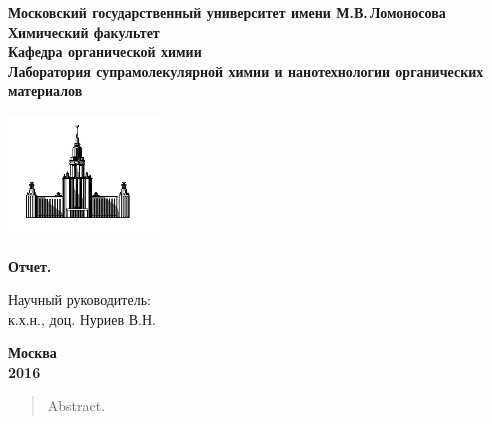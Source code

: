 \documentclass[a4paper]{article}
\begin{document}
\begin{titlepage}
\centering
\textbf{\large Московский государственный университет имени М.В.\,Ломоносова\\
\vspace*{0.1cm} Химический факультет\\
\vspace*{0.1cm}
\noindent\makebox[\linewidth]{\rule{\paperwidth}{0.4pt}}
\vspace*{0.1cm}
 Кафедра органической химии\\
\vspace*{0.1cm} Лаборатория супрамолекулярной химии и нанотехнологии органических материалов \\}
\vspace*{2cm}

\begin{center}
\includegraphics[width=0.3\textwidth]{pictures/logo.jpg}
\end{center}

\vspace*{2cm}
\Large \textbf{Отчет.}
\vspace*{2cm}

\begin{flushright}
Научный руководитель:\\
к.х.н., доц. Нуриев В.Н.
\end{flushright}
\vfill
\large\textbf{Москва\\ 2016}
\end{titlepage}

\tableofcontents

\begin{abstract}
Abstract.
\end{abstract}
\end{document}
